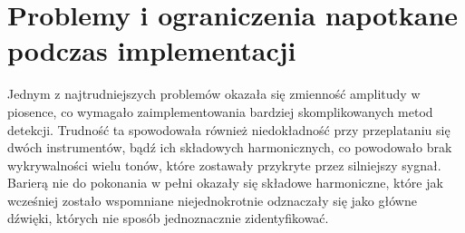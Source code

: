 \section{Problemy i ograniczenia napotkane podczas implementacji}

Jednym z najtrudniejszych problemów okazała się zmienność amplitudy w piosence, co wymagało zaimplementowania bardziej skomplikowanych metod detekcji. Trudność ta spowodowała również niedokładność przy przeplataniu się dwóch instrumentów, bądź ich składowych harmonicznych, co powodowało brak wykrywalności wielu tonów, które zostawały przykryte przez silniejszy sygnał.
Barierą nie do pokonania w pełni okazały się składowe harmoniczne, które jak wcześniej zostało wspomniane niejednokrotnie odznaczały się jako główne dźwięki, których nie sposób jednoznacznie zidentyfikować.
